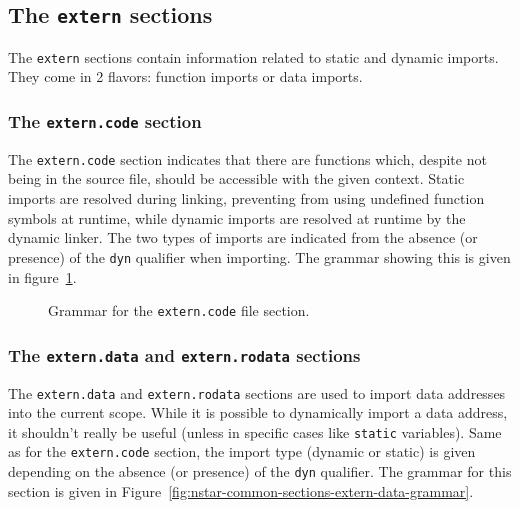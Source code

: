 \subsection{The \texttt{extern} sections}\label{subsec:nstar-common-sections-extern}

The \texttt{extern} sections contain information related to static and dynamic imports.
They come in 2 flavors: function imports or data imports.

\subsubsection{The \texttt{extern.code} section}\label{subsubsec:nstar-common-sections-extern-code}

The \texttt{extern.code} section indicates that there are functions which, despite not being in the source file, should be accessible with the given context.
Static imports are resolved during linking, preventing from using undefined function symbols at runtime, while dynamic imports are resolved at runtime by the dynamic linker.
The two types of imports are indicated from the absence (or presence) of the \texttt{dyn} qualifier when importing.
The grammar showing this is given in figure~\ref{fig:nstar-common-sections-extern-code-grammar}.

\begin{figure}[htb]
  \centering

  \caption{Grammar for the \texttt{extern.code} file section.}
  \label{fig:nstar-common-sections-extern-code-grammar}
\end{figure}

\subsubsection{The \texttt{extern.data} and \texttt{extern.rodata} sections}\label{subsubsec:nstar-common-sections-extern-data}

The \texttt{extern.data} and \texttt{extern.rodata} sections are used to import data addresses into the current scope.
While it is possible to dynamically import a data address, it shouldn't really be useful (unless in specific cases like \texttt{static} variables).
Same as for the \texttt{extern.code} section, the import type (dynamic or static) is given depending on the absence (or presence) of the \texttt{dyn} qualifier.
The grammar for this section is given in Figure~\ref{fig:nstar-common-sections-extern-data-grammar}.

